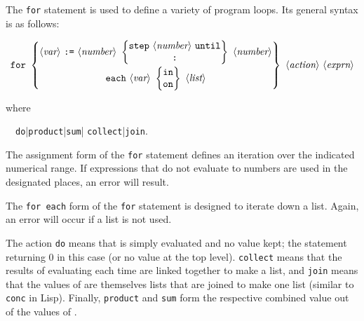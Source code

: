 The \texttt{for} statement
is used to define a variety of program
loops.  Its general syntax is as follows:
\begin{small}
  \[ \texttt{for}\ \left\{
  \begin{array}{@{}c@{}}
    \langle\textit{var}\rangle\ \texttt{:=}\ \langle\textit{number}\rangle\
    \left\{
    \begin{array}{@{}c@{}}
      \texttt{step}\ \langle\textit{number}\rangle\ \texttt{until} \\
      \texttt{:}
    \end{array}
    \right\}\
    \langle\textit{number}\rangle \\[3mm]
    \texttt{each}\ \langle\textit{var}\rangle\
    \left\{
    \begin{array}{@{}c@{}}
      \texttt{in} \\ \texttt{on}
    \end{array}
    \right\}\
    \langle\textit{list}\rangle
  \end{array}
  \right\}\ \langle\textit{action}\rangle\ \langle\textit{exprn}\rangle \]
\end{small}%
%
where
\begin{syntax}
  \ \BNFprod\ \texttt{do}|\texttt{product}|\texttt{sum}|%
                           \texttt{collect}|\texttt{join}.
\end{syntax}
The assignment form of the \texttt{for} statement defines an
iteration over the indicated numerical range.  If expressions that do not
evaluate to numbers are used in the designated places, an error will
result.

The \texttt{for each}\ttindex{for each} form of the \texttt{for} statement is
designed to iterate down a list.  Again, an error will occur if a list is
not used.

The action \texttt{do}\ttindextype{do}{keyword} means that  is simply
evaluated and no value kept; the statement returning 0 in this case (or no
value at the top level). \texttt{collect} means that the results of
evaluating  each time are linked together to make a list,
and \texttt{join} means that the values of \meta{exprn} are themselves
lists that are joined to make one list (similar to \texttt{conc} in Lisp).
Finally, \texttt{product} and \texttt{sum}
form the respective combined value out of the values of \meta{exprn}.

